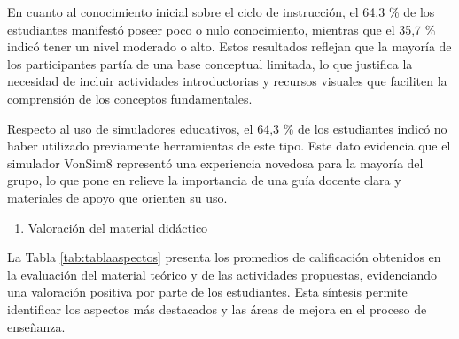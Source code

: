\documentclass[12pt,oneside]{templates/unerthesis}
\providecommand{\tightlist}{%
  \setlength{\itemsep}{0pt}\setlength{\parskip}{0pt}}
\begin{document}
En cuanto al conocimiento inicial sobre el ciclo de instrucción, el 64,3 \% de los estudiantes manifestó poseer poco o nulo conocimiento, mientras que el 35,7 \% indicó tener un nivel moderado o alto. Estos resultados reflejan que la mayoría de los participantes partía de una base conceptual limitada, lo que justifica la necesidad de incluir actividades introductorias y recursos visuales que faciliten la comprensión de los conceptos fundamentales.

Respecto al uso de simuladores educativos, el 64,3 \% de los estudiantes indicó no haber utilizado previamente herramientas de este tipo. Este dato evidencia que el simulador VonSim8 representó una experiencia novedosa para la mayoría del grupo, lo que pone en relieve la importancia de una guía docente clara y materiales de apoyo que orienten su uso.

\begin{enumerate}
\def\labelenumi{\arabic{enumi}.}
\setcounter{enumi}{1}
\tightlist
\item
  Valoración del material didáctico
\end{enumerate}

La Tabla \ref{tab:tablaaspectos} presenta los promedios de calificación obtenidos en la evaluación del material teórico y de las actividades propuestas, evidenciando una valoración positiva por parte de los estudiantes. Esta síntesis permite identificar los aspectos más destacados y las áreas de mejora en el proceso de enseñanza.
\end{document}
